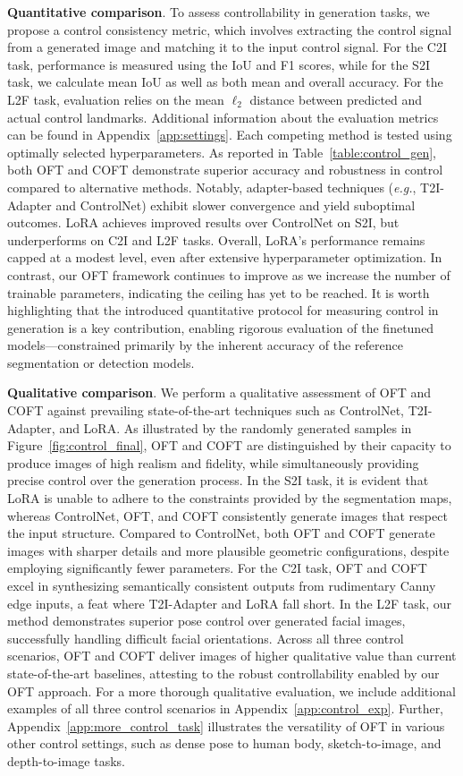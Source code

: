 {\textbf{Quantitative comparison}. To assess controllability in generation tasks, we propose a control consistency metric, which involves extracting the control signal from a generated image and matching it to the input control signal. For the C2I task, performance is measured using the IoU and F1 scores, while for the S2I task, we calculate mean IoU as well as both mean and overall accuracy. For the L2F task, evaluation relies on the mean $\ell_2$ distance between predicted and actual control landmarks. Additional information about the evaluation metrics can be found in Appendix~\ref{app:settings}. Each competing method is tested using optimally selected hyperparameters. As reported in Table~\ref{table:control_gen}, both OFT and COFT demonstrate superior accuracy and robustness in control compared to alternative methods. Notably, adapter-based techniques (\emph{e.g.}, T2I-Adapter and ControlNet) exhibit slower convergence and yield suboptimal outcomes. LoRA achieves improved results over ControlNet on S2I, but underperforms on C2I and L2F tasks. Overall, LoRA’s performance remains capped at a modest level, even after extensive hyperparameter optimization. In contrast, our OFT framework continues to improve as we increase the number of trainable parameters, indicating the ceiling has yet to be reached. It is worth highlighting that the introduced quantitative protocol for measuring control in generation is a key contribution, enabling rigorous evaluation of the finetuned models—constrained primarily by the inherent accuracy of the reference segmentation or detection models.

\textbf{Qualitative comparison}. We perform a qualitative assessment of OFT and COFT against prevailing state-of-the-art techniques such as ControlNet, T2I-Adapter, and LoRA. As illustrated by the randomly generated samples in Figure~\ref{fig:control_final}, OFT and COFT are distinguished by their capacity to produce images of high realism and fidelity, while simultaneously providing precise control over the generation process. In the S2I task, it is evident that LoRA is unable to adhere to the constraints provided by the segmentation maps, whereas ControlNet, OFT, and COFT consistently generate images that respect the input structure. Compared to ControlNet, both OFT and COFT generate images with sharper details and more plausible geometric configurations, despite employing significantly fewer parameters. For the C2I task, OFT and COFT excel in synthesizing semantically consistent outputs from rudimentary Canny edge inputs, a feat where T2I-Adapter and LoRA fall short. In the L2F task, our method demonstrates superior pose control over generated facial images, successfully handling difficult facial orientations. Across all three control scenarios, OFT and COFT deliver images of higher qualitative value than current state-of-the-art baselines, attesting to the robust controllability enabled by our OFT approach. For a more thorough qualitative evaluation, we include additional examples of all three control scenarios in Appendix~\ref{app:control_exp}. Further, Appendix~\ref{app:more_control_task} illustrates the versatility of OFT in various other control settings, such as dense pose to human body, sketch-to-image, and depth-to-image tasks.

}
